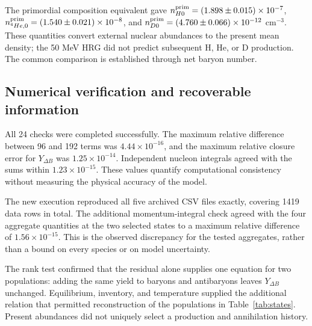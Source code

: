 The primordial composition equivalent gave $n_{H0}^{\rm prim}=(1.898\pm0.015)\times10^{-7}$, $n_{{}^4He,0}^{\rm prim}=(1.540\pm0.021)\times10^{-8}$, and $n_{D0}^{\rm prim}=(4.760\pm0.066)\times10^{-12}$ cm$^{-3}$. These quantities convert external nuclear abundances to the present mean density; the 50 MeV HRG did not predict subsequent H, He, or D production. The common comparison is established through net baryon number.

\subsection{Numerical verification and recoverable information}
All 24 checks were completed successfully. The maximum relative difference between 96 and 192 terms was $4.44\times10^{-16}$, and the maximum relative closure error for $Y_{\Delta B}$ was $1.25\times10^{-14}$. Independent nucleon integrals agreed with the sums within $1.23\times10^{-15}$. These values quantify computational consistency without measuring the physical accuracy of the model.

The new execution reproduced all five archived CSV files exactly, covering 1419 data rows in total. The additional momentum-integral check agreed with the four aggregate quantities at the two selected states to a maximum relative difference of $1.56\times10^{-15}$. This is the observed discrepancy for the tested aggregates, rather than a bound on every species or on model uncertainty.

The rank test confirmed that the residual alone supplies one equation for two populations: adding the same yield to baryons and antibaryons leaves $Y_{\Delta B}$ unchanged. Equilibrium, inventory, and temperature supplied the additional relation that permitted reconstruction of the populations in Table~\ref{tab:states}. Present abundances did not uniquely select a production and annihilation history.
